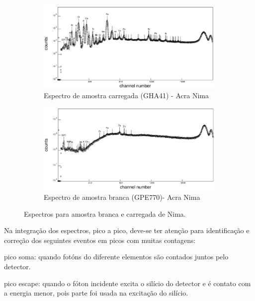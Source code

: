 \begin{figure}[H]
  \centering
  \begin{subfigure}[b]{0.7\textwidth}
    \includegraphics[width=\textwidth]{../inputs/images/winqxas/GHA41editado.pdf}
    \caption{Espectro de amostra carregada (GHA41) - Acra Nima}
  \end{subfigure}
  \begin{subfigure}[b]{0.7\textwidth}
    \includegraphics[width=\textwidth]{../inputs/images/winqxas/GPE770editado.pdf}
     \caption{Espectro de amostra branca (GPE770)- Acra Nima}
  \end{subfigure}
  \caption{Espectros para amostra branca e carregada de Nima. \label{fig:winqxas}}
\end{figure}

Na integração dos espectros, pico a pico, deve-se ter atenção 
para identificação e correção dos seguintes eventos em picos com 
muitas contagens: 

\begin{itemize}
  \begin{spacing}{1.0}
  \item pico soma: quando fotóns do diferente elementos são contados
        juntos pelo detector. 
  \item pico escape: quando o fóton incidente excita o silício do detector
        e é contato com a energia menor, pois parte foi usada na excitação 
        do silício. 
  \end{spacing}
\end{itemize}

